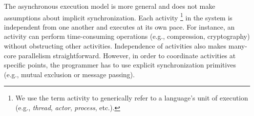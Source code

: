 \documentclass{acm_proc_article-sp}
\newcommand{\CEU}{\textsc{C\'{e}u}\xspace}
\newcommand{\1}{\;}
\newcommand{\2}{\;\;}
\newcommand{\3}{\;\;\;}
\newcommand{\5}{\;\;\;\;\;}
\begin{document}

The asynchronous execution model is more general and does not make assumptions 
about implicit synchronization.
Each activity%
\footnote{We use the term activity to generically refer to a language's unit of 
execution (e.g., \emph{thread}, \emph{actor}, \emph{process}, etc.).}
in the system is independent from one another and executes at its own pace.
%
For instance, an activity can perform time-consuming operations (e.g., 
compression, cryptography) without obstructing other activities.
%
Independence of activities also makes many-core parallelism straightforward.
%
However, in order to coordinate activities at specific points, the programmer 
has to use explicit synchronization primitives (e.g., mutual exclusion or 
message passing).

\end{document}
